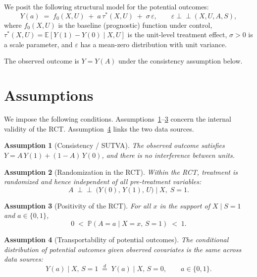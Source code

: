 \documentclass[10pt]{article}
\theoremstyle{plain}
\newtheorem{assumption}{Assumption}
\theoremstyle{definition}
\theoremstyle{remark}
\newcommand{\E}{\mathbb{E}}
\newcommand{\p}{\mathbb{P}}
\newcommand{\indep}{\perp\!\!\!\!\!\perp}
\newcommand{\eqd}{\overset{d}{=}}
\newcommand{\CATE}{\tau}
\begin{document}
We posit the following structural model for the potential outcomes:
\begin{equation}\label{eq:structural}
  Y(a) \;=\; f_0(X, U) \;+\; a\,\CATE^*(X, U) \;+\; \sigma\,\varepsilon, 
  \qquad \varepsilon \indep (X, U, A, S),
\end{equation}
where $f_0(X,U)$ is the baseline (prognostic) function under control, $\CATE^*(X,U) = \E[Y(1) - Y(0) \mid X, U]$ is the unit-level treatment effect, $\sigma > 0$ is a scale parameter, and $\varepsilon$ has a mean-zero distribution with unit variance.

The observed outcome is $Y = Y(A)$ under the consistency assumption below.

\section{Assumptions}

We impose the following conditions. Assumptions~\ref{as:sutva}--\ref{as:positivity_rct} concern the internal validity of the RCT. Assumption~\ref{as:transport} links the two data sources.

\begin{assumption}[Consistency / SUTVA]\label{as:sutva}
  The observed outcome satisfies $Y = A\,Y(1) + (1-A)\,Y(0)$, and there is no interference between units.
\end{assumption}

\begin{assumption}[Randomization in the RCT]\label{as:rct_unconf}
  Within the RCT, treatment is randomized and hence independent of all pre-treatment variables:
  \begin{equation}\label{eq:rct_unconf}
    A \;\indep\; \bigl(Y(0),\, Y(1),\, U\bigr) \;\Big|\; X,\; S=1.
  \end{equation}
\end{assumption}

\begin{assumption}[Positivity of the RCT]\label{as:positivity_rct}
  For all $x$ in the support of $X \mid S=1$ and $a \in \{0,1\}$,
  \begin{equation}
    0 \;<\; \p(A = a \mid X = x,\, S = 1) \;<\; 1.
  \end{equation}
\end{assumption}

\begin{assumption}[Transportability of potential outcomes]\label{as:transport}
  The conditional distribution of potential outcomes given observed covariates is the same across data sources:
  \begin{equation}\label{eq:transport}
    Y(a) \mid X,\, S = 1 \;\eqd\; Y(a) \mid X,\, S = 0, \qquad a \in \{0,1\}.
  \end{equation}
\end{assumption}
\end{document}
